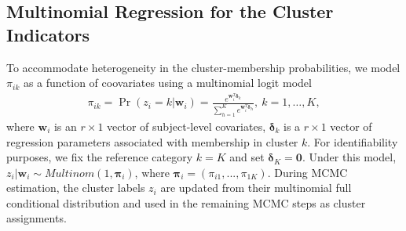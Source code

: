 \documentclass[useAMS,referee]{biom}
\begin{document}
\subsection{Multinomial Regression for the Cluster Indicators}
To accommodate heterogeneity in the cluster-membership probabilities, we model $\pi_{ik}$ as a function of coovariates using a multinomial logit model 
\begin{eqnarray}
\pi_{ik} = \Pr(z_i = k|\mathbf{w}_i) = \frac{e^{\mathbf{w}_i^T \boldsymbol\delta_k}}{\sum_{h = 1}^K e^{\mathbf{w}_i^T \boldsymbol\delta_{h}}},~ k=1,\ldots,K,
\end{eqnarray}
where $\mathbf{w}_i$ is an $r\times 1$ vector of subject-level covariates, $\boldsymbol\delta_k$ is a $r\times 1$ vector of regression parameters associated with membership in cluster $k$. For identifiability purposes, we fix the reference category $k = K$ and set $\boldsymbol\delta_K = \mathbf{0}$. Under this model, $z_i|\mathbf{w}_i \sim Multinom(1,\boldsymbol\pi_i)$, where $\boldsymbol\pi_i = (\pi_{i1},...,\pi_{1K})$. During MCMC estimation, the cluster labels $z_i$ are updated from their multinomial full conditional distribution and used in the remaining MCMC steps as cluster assignments.
\end{document}
